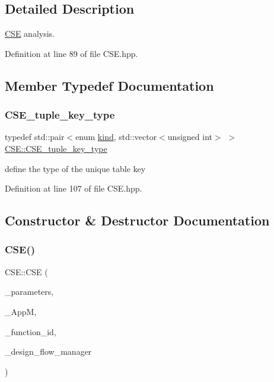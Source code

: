\subsection{Detailed Description}
\hyperlink{classCSE}{C\+SE} analysis. 

Definition at line 89 of file C\+S\+E.\+hpp.



\subsection{Member Typedef Documentation}
\mbox{\label{classCSE_a541f4bbb7540d84d1ed98f9c44b74417}} 
\subsubsection{\texorpdfstring{C\+S\+E\+\_\+tuple\+\_\+key\+\_\+type}{CSE\_tuple\_key\_type}}
{\footnotesize\ttfamily typedef std\+::pair$<$enum \hyperlink{tree__common_8hpp_a9efbd7c7191fb190b76c2fd05d6e7b45}{kind}, std\+::vector$<$unsigned int$>$ $>$ \hyperlink{classCSE_a541f4bbb7540d84d1ed98f9c44b74417}{C\+S\+E\+::\+C\+S\+E\+\_\+tuple\+\_\+key\+\_\+type}\hspace{0.3cm}{\ttfamily [private]}}



define the type of the unique table key 



Definition at line 107 of file C\+S\+E.\+hpp.



\subsection{Constructor \& Destructor Documentation}
\mbox{\label{classCSE_a0c288efafdfb4e2b4023d984e330b110}} 
\subsubsection{\texorpdfstring{C\+S\+E()}{CSE()}}
{\footnotesize\ttfamily C\+S\+E\+::\+C\+SE (\begin{DoxyParamCaption}\item[{const \hyperlink{Parameter_8hpp_a37841774a6fcb479b597fdf8955eb4ea}{Parameter\+Const\+Ref}}]{\+\_\+parameters,  }\item[{const \hyperlink{application__manager_8hpp_a04ccad4e5ee401e8934306672082c180}{application\+\_\+manager\+Ref}}]{\+\_\+\+AppM,  }\item[{unsigned int}]{\+\_\+function\+\_\+id,  }\item[{const Design\+Flow\+Manager\+Const\+Ref}]{\+\_\+design\+\_\+flow\+\_\+manager }\end{DoxyParamCaption})}



